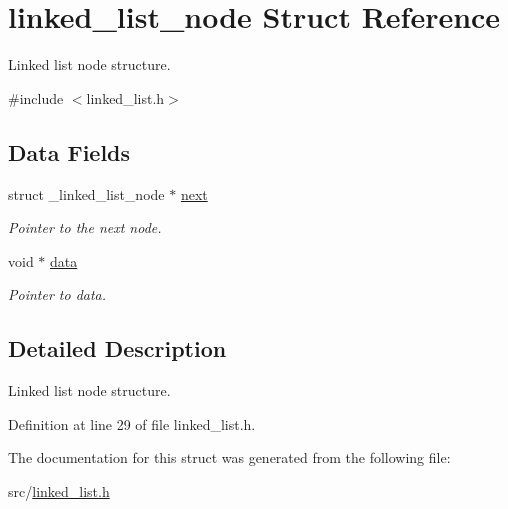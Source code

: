 \hypertarget{structlinked__list__node}{\section{linked\-\_\-list\-\_\-node Struct Reference}
\label{structlinked__list__node}
}


Linked list node structure.  




{\ttfamily \#include $<$linked\-\_\-list.\-h$>$}

\subsection*{Data Fields}
\begin{DoxyCompactItemize}
\item 
\hypertarget{structlinked__list__node_a2faa44c9514ef0a3440d7567d6096661}{struct \-\_\-linked\-\_\-list\-\_\-node $\ast$ \hyperlink{structlinked__list__node_a2faa44c9514ef0a3440d7567d6096661}{next}}\label{structlinked__list__node_a2faa44c9514ef0a3440d7567d6096661}

\begin{DoxyCompactList}\small\item\em Pointer to the next node. \end{DoxyCompactList}\item 
\hypertarget{structlinked__list__node_a95b8e30599d7df461a38c765e20fcb69}{void $\ast$ \hyperlink{structlinked__list__node_a95b8e30599d7df461a38c765e20fcb69}{data}}\label{structlinked__list__node_a95b8e30599d7df461a38c765e20fcb69}

\begin{DoxyCompactList}\small\item\em Pointer to data. \end{DoxyCompactList}\end{DoxyCompactItemize}


\subsection{Detailed Description}
Linked list node structure. 

Definition at line 29 of file linked\-\_\-list.\-h.



The documentation for this struct was generated from the following file\-:\begin{DoxyCompactItemize}
\item 
src/\hyperlink{linked__list_8h}{linked\-\_\-list.\-h}\end{DoxyCompactItemize}
